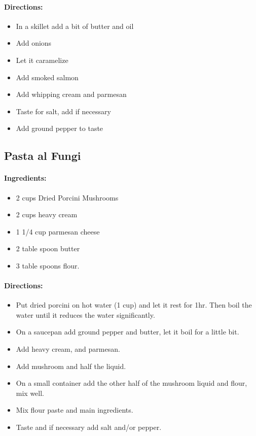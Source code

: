 \documentclass{article}
\begin{document}
\paragraph{Directions:}
\begin{itemize}
    \item In a skillet add a bit of butter and oil
    \item Add onions
    \item Let it caramelize
    \item Add smoked salmon
    \item Add whipping cream and parmesan
    \item Taste for salt, add if necessary
    \item Add ground pepper to taste
\end{itemize}

\subsection{Pasta al Fungi}

\paragraph{Ingredients:}
\begin{itemize}
    \item 2 cups Dried Porcini Mushrooms
    \item 2 cups heavy cream
    \item 1 1/4 cup parmesan cheese
    \item 2 table spoon butter
    \item 3 table spoons flour.
\end{itemize}

\paragraph{Directions:}
\begin{itemize}
    \item Put dried porcini on hot water (1 cup) and let it rest for 1hr. Then boil the water until it reduces the water significantly.
    \item On a saucepan add ground pepper and butter, let it boil for a little bit.
    \item Add heavy cream, and parmesan.
    \item Add mushroom and half the liquid.
    \item On a small container add the other half of the mushroom liquid and flour, mix well.
    \item Mix flour paste and main ingredients.
    \item Taste and if necessary add salt and/or pepper.
\end{itemize}
\end{document}
